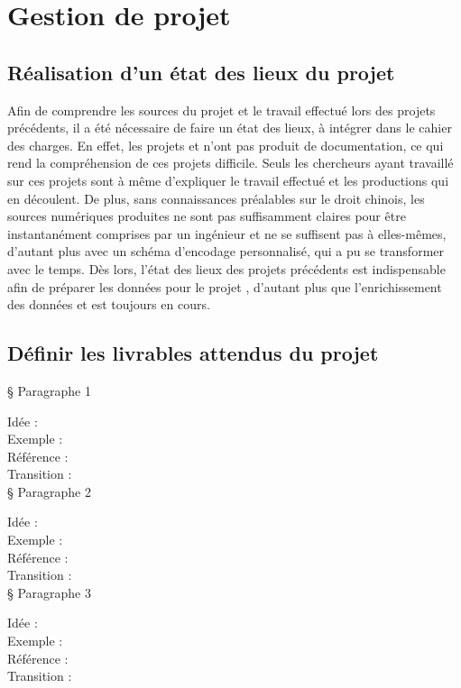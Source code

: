 \section{Gestion de projet}
    \subsection{Réalisation d’un état des lieux du projet}

Afin de comprendre les sources du projet \COREL et le travail effectué lors des projets précédents, il a été nécessaire de faire un état des lieux, à intégrer dans le cahier des charges. En effet, les projets \LSC et \EPJ n'ont pas produit de documentation, ce qui rend la compréhension de ces projets difficile. Seuls les chercheurs ayant travaillé sur ces projets sont à même d'expliquer le travail effectué et les productions qui en découlent. De plus, sans connaissances préalables sur le droit chinois, les sources numériques produites ne sont pas suffisamment claires pour être instantanément comprises par un ingénieur et ne se suffisent pas à elles-mêmes, d'autant plus avec un schéma d'encodage personnalisé, qui a pu se transformer avec le temps. Dès lors, l'état des lieux des projets précédents est indispensable afin de préparer les données pour le projet \COREL, d'autant plus que l'enrichissement des données \LSC et \EPJ est toujours en cours. 



\subsection{Définir les livrables attendus du projet}

§ Paragraphe 1

Idée :\\
Exemple :\\
Référence :\\
Transition :\\

§ Paragraphe 2

Idée :\\
Exemple :\\
Référence :\\
Transition :\\

§ Paragraphe 3

Idée :\\
Exemple :\\
Référence :\\
Transition :\\

